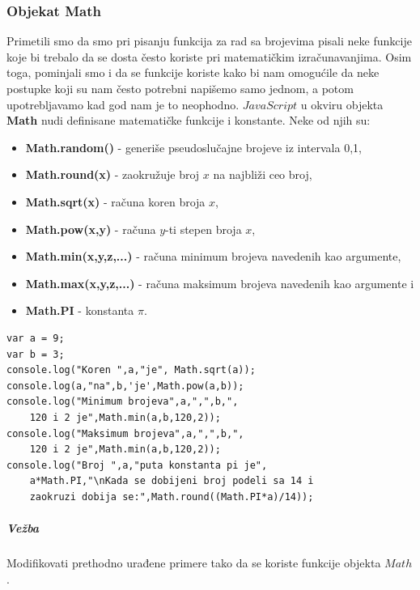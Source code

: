 \documentclass[a4paper]{article}
\begin{document}
\subsubsection{Objekat Math}
Primetili smo da smo pri pisanju funkcija za rad sa brojevima pisali neke funkcije koje bi trebalo da se dosta često koriste pri matematičkim izračunavanjima. Osim toga, pominjali smo i da se funkcije koriste kako bi nam omogućile da neke postupke koji su nam često potrebni napišemo samo jednom, a potom upotrebljavamo kad god nam je to neophodno. $JavaScript$ u okviru objekta \textbf{Math} nudi definisane matematičke funkcije i konstante. Neke od njih su:
\begin{itemize}
	\item \textbf{Math.random()} - generiše pseudoslučajne brojeve iz intervala 0,1, 
	\item \textbf{Math.round(x)} - zaokružuje broj $x$ na najbliži ceo broj,  
	\item \textbf{Math.sqrt(x)} - računa koren broja $x$, 
	\item \textbf{Math.pow(x,y)} - računa $y$-ti stepen broja $x$,  
	\item \textbf{Math.min(x,y,z,...)} - računa minimum brojeva navedenih kao argumente,
	\item \textbf{Math.max(x,y,z,...)} - računa maksimum brojeva navedenih kao argumente i
	\item \textbf{Math.PI} - konstanta $\pi$.
\end{itemize} 
\begin{lstlisting}[backgroundcolor = \color{lightgray}]
var a = 9;
var b = 3;
console.log("Koren ",a,"je", Math.sqrt(a));
console.log(a,"na",b,'je',Math.pow(a,b));
console.log("Minimum brojeva",a,",",b,", 
	120 i 2 je",Math.min(a,b,120,2));
console.log("Maksimum brojeva",a,",",b,",
	120 i 2 je",Math.min(a,b,120,2));
console.log("Broj ",a,"puta konstanta pi je", 
	a*Math.PI,"\nKada se dobijeni broj podeli sa 14 i 
	zaokruzi dobija se:",Math.round((Math.PI*a)/14));
\end{lstlisting}


\subparagraph{Vežba}
Modifikovati prethodno urađene primere tako da se koriste funkcije objekta $Math$.
\end{document}
